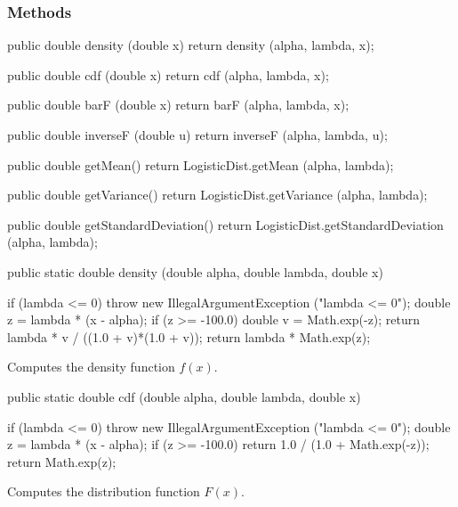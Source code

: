 \subsubsection* {Methods}

\begin{code}\begin{hide}

   public double density (double x) {
      return density (alpha, lambda, x);
   }

   public double cdf (double x) {
      return cdf (alpha, lambda, x);
   }

   public double barF (double x) {
      return barF (alpha, lambda, x);
   }

   public double inverseF (double u) {
      return inverseF (alpha, lambda, u);
   }

   public double getMean() {
      return LogisticDist.getMean (alpha, lambda);
   }

   public double getVariance() {
      return LogisticDist.getVariance (alpha, lambda);
   }

   public double getStandardDeviation() {
      return LogisticDist.getStandardDeviation (alpha, lambda);
   }\end{hide}

   public static double density (double alpha, double lambda, double x)\begin{hide} {
      if (lambda <= 0)
        throw new IllegalArgumentException ("lambda <= 0");
      double z = lambda * (x - alpha);
      if (z >= -100.0) {
         double v = Math.exp(-z);
         return lambda * v / ((1.0 + v)*(1.0 + v));
      }
      return lambda * Math.exp(z);
   }\end{hide}
\end{code}
\begin{tabb} Computes the density function $f(x)$.
\end{tabb}
\begin{code}

   public static double cdf (double alpha, double lambda, double x)\begin{hide} {
      if (lambda <= 0)
        throw new IllegalArgumentException ("lambda <= 0");
      double z = lambda * (x - alpha);
      if (z >= -100.0)
         return 1.0 / (1.0 + Math.exp(-z));
      return Math.exp(z);
   }\end{hide}
\end{code}
 \begin{tabb}
  Computes the distribution function $F(x)$.
 \end{tabb}
